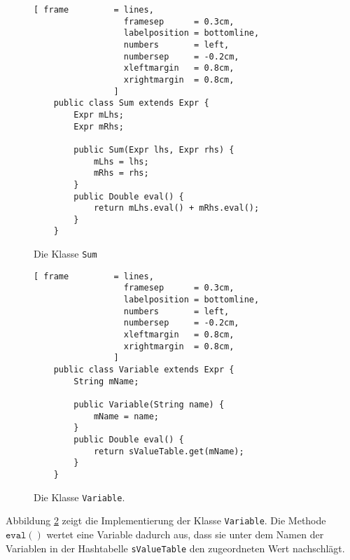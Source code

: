 \begin{figure}[!ht]
\centering
\begin{Verbatim}[ frame         = lines, 
                  framesep      = 0.3cm, 
                  labelposition = bottomline,
                  numbers       = left,
                  numbersep     = -0.2cm,
                  xleftmargin   = 0.8cm,
                  xrightmargin  = 0.8cm,
                ]
    public class Sum extends Expr {
        Expr mLhs;
        Expr mRhs;
        
        public Sum(Expr lhs, Expr rhs) {
            mLhs = lhs;
            mRhs = rhs;
        }
        public Double eval() {
            return mLhs.eval() + mRhs.eval();
        }
    }
\end{Verbatim}
\vspace*{-0.3cm}
\caption{Die Klasse \texttt{Sum}}
\label{fig:Sum2.java}
\end{figure}

\begin{figure}[!ht]
\centering
\begin{Verbatim}[ frame         = lines, 
                  framesep      = 0.3cm, 
                  labelposition = bottomline,
                  numbers       = left,
                  numbersep     = -0.2cm,
                  xleftmargin   = 0.8cm,
                  xrightmargin  = 0.8cm,
                ]
    public class Variable extends Expr {
        String mName;
        
        public Variable(String name) {
            mName = name;
        }    
        public Double eval() {
            return sValueTable.get(mName);
        }
    }
\end{Verbatim}
\vspace*{-0.3cm}
\caption{Die Klasse \texttt{Variable}.}
\label{fig:Variable2.java}
\end{figure}
\vspace*{\fill} \pagebreak

Abbildung \ref{fig:Variable2.java} zeigt die Implementierung der Klasse \texttt{Variable}.  Die
Methode $\texttt{eval}()$ wertet eine Variable dadurch aus, dass sie unter dem Namen der Variablen
in der Hashtabelle \texttt{sValueTable} den zugeordneten Wert nachschl\"agt.

